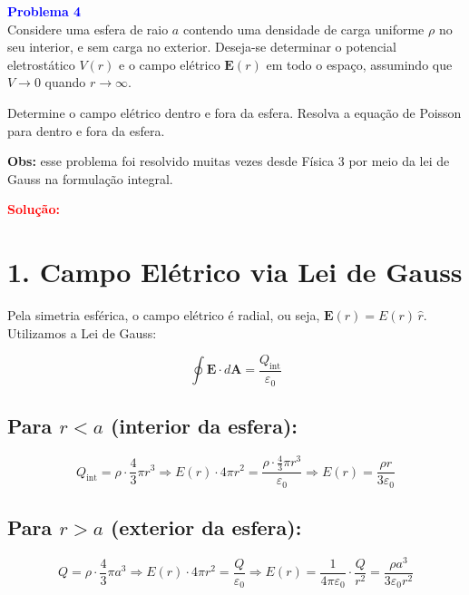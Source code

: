 \documentclass[a4paper,12pt]{article}
\begin{document}
\begin{flushleft}
\textbf{\textcolor{blue}{\Large Problema 4}}\\

Considere uma esfera de raio \( a \) contendo uma densidade de carga uniforme \( \rho \) no 
seu interior, e sem carga no exterior. Deseja-se determinar o potencial eletrostático \( V(r) \) 
e o campo elétrico \( \mathbf{E}(r) \) em todo o espaço, \colorbox{red!20}{assumindo que \( V \rightarrow 0 \) 
quando \( r \rightarrow \infty \)}. 

Determine o campo elétrico dentro e fora da esfera. Resolva a equação de Poisson para dentro 
e fora da esfera.

\textbf{Obs:} esse problema foi resolvido muitas vezes desde Física 3 por meio da lei 
de Gauss na formulação integral.

\textcolor{red}{\textbf{Solução:}}\\

\section*{1. Campo Elétrico via Lei de Gauss}

Pela simetria esférica, o campo elétrico é radial, ou seja, \( \mathbf{E}(r) = E(r)\, \hat{r} \). Utilizamos a Lei de Gauss:

\begin{equation}
\boxed{\oint \mathbf{E} \cdot d\mathbf{A} = \frac{Q_{\text{int}}}{\varepsilon_0}}
\end{equation}

\subsection*{\colorbox{green!15}{Para \( r < a \) (interior da esfera):}}

\begin{equation}
Q_{\text{int}} = \rho \cdot \frac{4}{3}\pi r^3
\Rightarrow E(r) \cdot 4\pi r^2 = \frac{\rho \cdot \frac{4}{3}\pi r^3}{\varepsilon_0}
\Rightarrow \boxed{E(r) = \frac{\rho r}{3\varepsilon_0}}
\end{equation}

\subsection*{\colorbox{red!15}{Para \( r > a \) (exterior da esfera):}}

\begin{equation}
Q = \rho \cdot \frac{4}{3} \pi a^3
\Rightarrow E(r) \cdot 4\pi r^2 = \frac{Q}{\varepsilon_0}
\Rightarrow \boxed{E(r) = \frac{1}{4\pi\varepsilon_0} \cdot \frac{Q}{r^2}
= \frac{\rho a^3}{3\varepsilon_0 r^2}}
\end{equation}


\end{flushleft}
\end{document}
